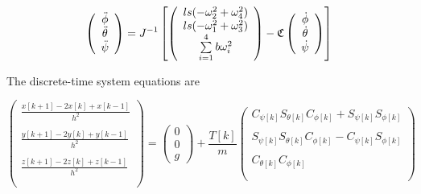 \begin{equation}
    \left(
        \begin{array}{c}
           \ddot{\phi}\\
           \ddot{\theta}\\
           \ddot{\psi}\\
        \end{array}
    \right) = J^{-1}
    \left[ \left(
        \begin{array}{c}
            l s (-\omega_2^2 + \omega_4^2)\\
            l s (-\omega_1^2 + \omega_3^2)\\
            \sum \limits_{i=1}^4 b \omega_i^2\\
        \end{array}
    \right) -
    \mathfrak{C}
    \left(
        \begin{array}{c}
           \dot{\phi}\\
           \dot{\theta}\\
           \dot{\psi}\\
        \end{array}
    \right)
    \right]
\end{equation}

The discrete-time system equations are

\begin{equation}
    \left(
        \begin{array}{c}
           \frac{x[k+1] -2 x[k] + x[k-1]}{h^2} \\\\
           \frac{y[k+1] -2 y[k] + y[k-1]}{h^2} \\\\
           \frac{z[k+1] -2 z[k] + z[k-1]}{h^2}\\\\
        \end{array}
    \right)
    = \left(
       \begin{array}{c}
        0\\
        0\\
        g
      \end{array}
    \right)
    +\frac{T[k]}{m}
     \left(
        \begin{array}{c}
             C_{\psi[k]}S_{\theta[k]}C_{\phi[k]} + S_{\psi[k]}S_{\phi[k]} \\\\
             S_{\psi[k]}S_{\theta[k]}C_{\phi[k]} - C_{\psi[k]}S_{\phi[k]} \\\\
             C_{\theta[k]} C_{\phi[k]} \\\\
        \end{array}
    \right)
\end{equation}


